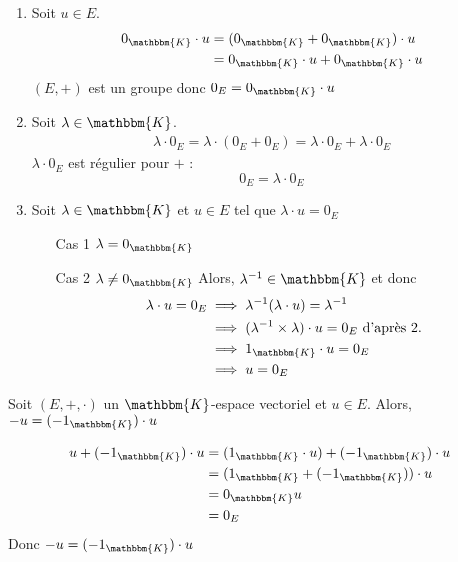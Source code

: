 \begin{prv}
	\begin{enumerate}
		\item Soit $u \in E$.
			\begin{align*}
				0_\mathbbm{K} \cdot u &= (0_\mathbbm{K}+0_\mathbbm{K}) \cdot  u\\
															&= 0_\mathbbm{K} \cdot u + 0_\mathbbm{K} \cdot u \\
			\end{align*}
			$(E,+)$ est un groupe donc $0_E = 0_\mathbbm{K} \cdot u$ 
		\item Soit $\lambda \in \mathbbm{K}$.
			\begin{align*}
				\lambda \cdot 0_E = \lambda\cdot (0_E+0_E) = \lambda \cdot 0_E + \lambda\cdot 0_E
			\end{align*}
			$\lambda\cdot 0_E$ est régulier pour $+$ : \[
				0_E = \lambda \cdot 0_E
			\]
		\item Soit $\lambda \in \mathbbm{K}$ et $u \in E$ tel que $\lambda \cdot u = 0_E$\\
			\begin{itemize}
				\item[\sc Cas 1] $\lambda = 0_\mathbbm{K}$
				\item[\sc Cas 2] $\lambda \neq 0_\mathbbm{K}$
					Alors, $\lambda^{-1} \in \mathbbm{K}$ et donc
					\begin{align*}
						\lambda \cdot u = 0_E &\implies \lambda^{-1}(\lambda\cdot u) = \lambda^{-1}\\
																	&\implies(\lambda^{-1}\times \lambda)\cdot u = 0_E \text{ d'après 2.}\\
																	&\implies 1_\mathbbm{K} \cdot u = 0_E\\
																	&\implies u = 0_E
					\end{align*}
			\end{itemize}
	\end{enumerate}
\end{prv}

\begin{prop}
	Soit $(E,+,\cdot)$ un $\mathbbm{K}$-espace vectoriel et $u \in E$. Alors, $-u = (-1_\mathbbm{K})\cdot u$
\end{prop}

\begin{prv}
	\begin{align*}
		u + (-1_{\mathbbm{K}})\cdot u&= (1_\mathbbm{K}\cdot u) + (-1_{\mathbbm{K}})\cdot u \\
		&= (1_\mathbbm{K} + (-1_{\mathbbm{K}}))\cdot u \\
		&= 0_\mathbbm{K} u  \\
		&= 0_E \\
	\end{align*}
	Donc $-u = (-1_\mathbbm{K}) \cdot u$
\end{prv}
